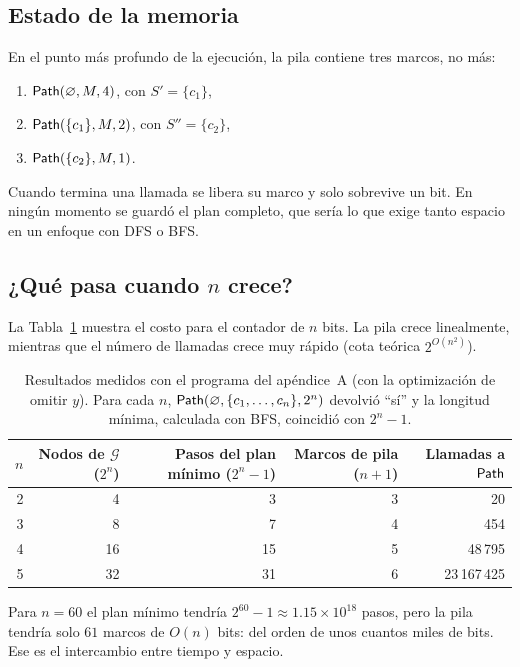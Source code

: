 \documentclass[11pt,letterpaper]{article}
\theoremstyle{plain}
\theoremstyle{definition}
\theoremstyle{remark}
\newcommand{\vacio}{\varnothing}
\newcommand{\nombreMat}[1]{\ensuremath{\text{\fontencoding{OT1}\fontfamily{cmss}\upshape\selectfont #1}}}
\newcommand{\Path}{\nombreMat{Path}}
\begin{document}
\subsection{Estado de la memoria}

En el punto más profundo de la ejecución, la pila contiene tres marcos, no más:
\begin{enumerate}[leftmargin=2em,itemsep=1pt]
\item $\Path(\vacio,M,4)$, con $S'=\{c_1\}$,
\item $\Path(\{c_1\},M,2)$, con $S''=\{c_2\}$,
\item $\Path(\{c_2\},M,1)$.
\end{enumerate}
Cuando termina una llamada se libera su marco y solo sobrevive un bit. En ningún momento se guardó el plan completo, que sería lo que exige tanto espacio en un enfoque con DFS o BFS.

\subsection{¿Qué pasa cuando $n$ crece?}

La Tabla~\ref{tab:escala} muestra el costo para el contador de $n$ bits. La pila crece linealmente, mientras que el número de llamadas crece muy rápido (cota teórica $2^{O(n^{2})}$).

\begin{table}[ht]
\centering
\begin{tabular}{@{}rrrrr@{}}
\toprule
$n$ & Nodos de $\mathcal{G}$ ($2^{n}$) & Pasos del plan mínimo ($2^{n}-1$) & Marcos de pila ($n+1$) & Llamadas a $\Path$\\
\midrule
2 & 4 & 3 & 3 & 20\\
3 & 8 & 7 & 4 & 454\\
4 & 16 & 15 & 5 & 48\,795\\
5 & 32 & 31 & 6 & 23\,167\,425\\
\bottomrule
\end{tabular}
\caption{Resultados medidos con el programa del apéndice~A (con la optimización de omitir $y$). Para cada $n$, $\Path(\vacio,\{c_1,\dots,c_n\},2^{n})$ devolvió ``sí'' y la longitud mínima, calculada con BFS, coincidió con $2^{n}-1$.}
\label{tab:escala}
\end{table}

Para $n=60$ el plan mínimo tendría $2^{60}-1\approx1.15\times10^{18}$ pasos, pero la pila tendría solo $61$ marcos de $O(n)$ bits: del orden de unos cuantos miles de bits. Ese es el intercambio entre tiempo y espacio.
\end{document}
